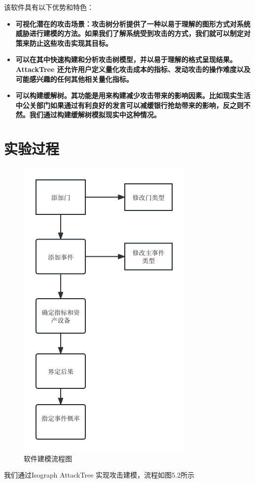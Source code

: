 该软件具有以下优势和特色：

\begin{itemize}
  \item \textbf{可视化潜在的攻击场景：攻击树分析提供了一种以易于理解的图形方式对系统威胁进行建模的方法。如果我们了解系统受到攻击的方式，我们就可以制定对策来防止这些攻击实现其目标。}
  \item \textbf{可以在其中快速构建和分析攻击树模型，并以易于理解的格式呈现结果。AttackTree 还允许用户定义量化攻击成本的指标、发动攻击的操作难度以及可能感兴趣的任何其他相关量化指标。}
  \item \textbf{可以构建缓解树。其功能是用来构建减少攻击带来的影响因素。比如现实生活中公关部门如果通过有利良好的发言可以减缓银行抢劫带来的影响，反之则不然。我们通过构建缓解树模拟现实中这种情况。}    
\end{itemize}
\section{实验过程}
\begin{figure}
  \centering
  \includegraphics[scale=0.8]{resources/img/c51.png}
  \caption{软件建模流程图}
\end{figure}
我们通过Isograph AttackTree 实现攻击建模，流程如图5.2所示
